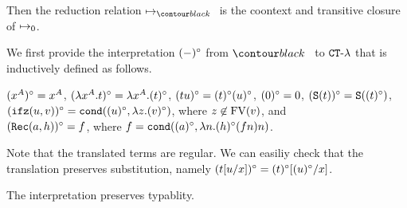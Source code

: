 Then the reduction relation $\reduces_\systemT$ is the coontext and transitive closure of $\mathbin{\mapsto}_0$. 


We first provide the interpretation $(-)^\circ$ from $\systemT$ to ${ {\tt CT} \mbox{-} \lambda}$
that is inductively defined as follows. 
\begin{center}
  $(x^A)^\circ = x^A$, 
  \qquad
  $(\lambda x^A.t)^\circ = \lambda x^A.(t)^\circ$, 
  \qquad
  $(tu)^\circ = (t)^\circ(u)^\circ$, 
  \qquad
  $(0)^\circ = 0$, 
  \qquad
  $({\tt S}(t))^\circ = {\tt S}((t)^\circ)$, 
  \\
  $({\tt ifz}(u,v))^\circ = {\tt cond}((u)^\circ,\lambda z.(v)^\circ)$, where $z\not\in{{\rm FV}}(v)$, and 
  \\
  $({\tt Rec}(a,h))^\circ = f$, where $f = {\tt cond}((a)^\circ,\lambda n.(h)^\circ(fn)n)$. 
\end{center}

Note that the translated terms are regular.
We can easiliy check that the translation preserves substitution,
namely $(t[u/x])^\circ = (t)^\circ[(u)^\circ/x]$. 

The interpretation preserves typablity. 

